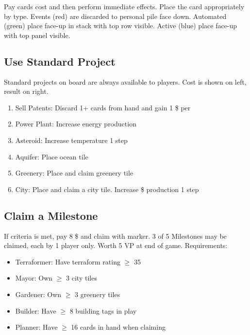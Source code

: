 \documentclass[12pt]{article}
\newenvironment{enumerateCustom}
{\begin{enumerate}
  \setlength{\itemsep}{1pt}
  \setlength{\parskip}{0pt}
  \setlength{\parsep}{0pt}}
{\end{enumerate}}
\newenvironment{itemizeCustom}
{\begin{itemize}
  \setlength{\itemsep}{1pt}
  \setlength{\parskip}{0pt}
  \setlength{\parsep}{0pt}}
{\end{itemize}}
\begin{document}
\begin{multicols*}{2}
    Pay cards cost and then perform immediate effects. Place the card appropriately by type. Events (red) are discarded to personal pile face down. Automated (green) place face-up in stack with top row visible. Active (blue) place face-up with top panel visible.

    \subsection*{Use Standard Project}
    Standard projects on board are always available to players. Cost is shown on left, result on right.
    \begin{enumerateCustom}
        \item Sell Patents: Discard 1+ cards from hand and gain 1 \$ per 
        \item Power Plant: Increase energy production
        \item Asteroid: Increase temperature 1 step
        \item Aquifer: Place ocean tile
        \item Greenery: Place and claim greenery tile
        \item City: Place and claim a city tile. Increase \$ production 1 step
    \end{enumerateCustom}

    \subsection*{Claim a Milestone}
    If criteria is met, pay 8 \$ and claim with marker. 3 of 5 Milestones may be claimed, each by 1 player only. Worth 5 VP at end of game. Requirements:
    \begin{itemizeCustom}
        \item Terraformer: Have terraform rating $\ge$ 35
        \item Mayor: Own $\ge$ 3 city tiles
        \item Gardener: Own $\ge$ 3 greenery tiles
        \item Builder: Have $\ge$ 8 building tags in play
        \item Planner: Have $\ge$ 16 cards in hand when claiming
    \end{itemizeCustom}


\end{multicols*}
\end{document}
